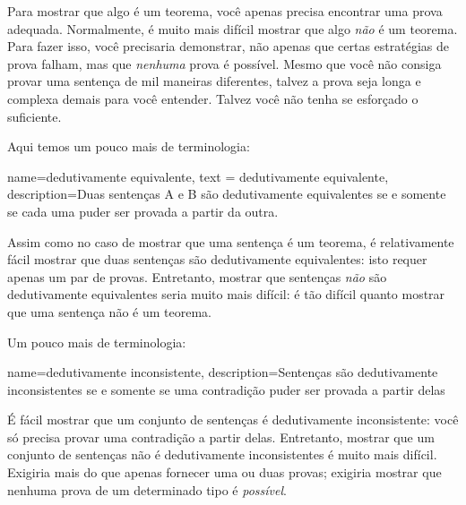 Para mostrar que algo \'e um teorema, voc\^e apenas precisa encontrar uma prova adequada. Normalmente, \'e muito mais dif\'icil mostrar que algo \emph{n\~ao} \'e um teorema. Para fazer isso, voc\^e precisaria demonstrar, n\~ao apenas que certas estrat\'egias de prova falham, mas que \emph{nenhuma} prova \'e poss\'ivel. Mesmo que voc\^e n\~ao consiga provar uma senten\c ca de mil maneiras diferentes, talvez a prova seja longa e complexa demais para voc\^e entender. Talvez voc\^e n\~ao tenha se esfor\c cado o suficiente.

Aqui temos um pouco mais de terminologia:
        
{
  name=dedutivamente equivalente,
  text = dedutivamente equivalente,
description={Duas senten\c cas A e B s\~ao  dedutivamente equivalentes  se e somente se cada  uma puder ser provada a partir da outra.}
}


Assim como no caso de mostrar que uma senten\c ca \'e um teorema, \'e relativamente f\'acil mostrar que duas senten\c cas s\~ao dedutivamente equivalentes: isto requer apenas um par de provas. Entretanto, mostrar que senten\c cas \emph{n\~ao} s\~ao dedutivamente equivalentes seria muito mais dif\'icil: \'e t\~ao dif\'icil quanto mostrar que uma senten\c ca n\~ao \'e um teorema.

Um pouco mais de terminologia:
        
{    name={dedutivamente inconsistente}, 
  description={Senten\c cas  s\~ao dedutivamente inconsistentes  se e somente se uma  contradi\c c\~ao puder ser provada a partir delas}
}

        \'E f\'acil mostrar que um conjunto de senten\c cas \'e dedutivamente inconsistente: voc\^e s\'o precisa provar uma contradi\c c\~ao a partir delas.  Entretanto,  mostrar que um conjunto de senten\c cas n\~ao \'e dedutivamente inconsistentes \'e muito mais dif\'icil. Exigiria mais do que apenas fornecer uma ou duas provas; exigiria mostrar que nenhuma prova de um determinado tipo \'e \emph{poss\'ivel}.

